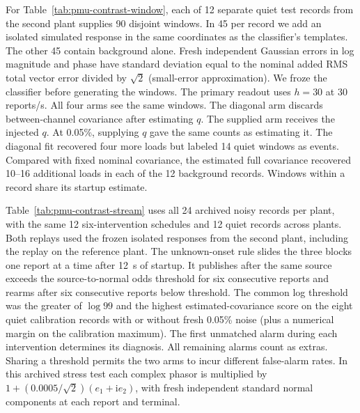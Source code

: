 For Table~\ref{tab:pmu-contrast-window}, each of 12 separate quiet
test records from the second plant supplies 90 disjoint windows.
In 45 per record we add an isolated simulated response in the same
coordinates as the classifier's templates. The other 45 contain
background alone. Fresh independent Gaussian errors in log magnitude
and phase have standard deviation equal to the nominal added RMS
total vector error divided by $\sqrt{2}$ (small-error approximation).
We froze the classifier before generating the windows. The primary
readout uses $h=30$ at 30 reports/s. All four arms see the same
windows. The diagonal arm discards between-channel covariance after
estimating $q$. The supplied arm receives the injected $q$.
At 0.05\%, supplying $q$ gave the same counts as estimating it.
The diagonal fit recovered four more loads but labeled 14 quiet
windows as events. Compared with fixed nominal covariance, the
estimated full covariance recovered 10--16 additional loads in each
of the 12 background records. Windows within a record share its
startup estimate.

\begin{table}[t]\centering\small
\caption{Continuous replay at 0.05\% added RMS total vector error.
Det., Fam.\ and Exact count detection, correct family and correct
family and asset before restoration among 72 interventions per plant.
Extra counts unmatched event-record alarms. Quiet$^+$ counts alarms
in \ContrastQuietHours{} normal hours per row.}
\label{tab:pmu-contrast-stream}

\end{table}

Table~\ref{tab:pmu-contrast-stream} uses all 24 archived noisy records
per plant, with the same 12 six-intervention schedules and 12 quiet
records across plants. Both replays used the frozen isolated responses
from the second plant, including the replay on the reference plant.
The unknown-onset rule slides the three blocks
one report at a time after 12~s of startup. It publishes after the
same source exceeds the source-to-normal odds threshold for six
consecutive reports and rearms after six consecutive reports below
threshold. The common log threshold was the greater of $\log 99$ and
the highest estimated-covariance score on the eight quiet calibration
records with or without fresh 0.05\% noise (plus a numerical margin
on the calibration maximum). The first unmatched alarm during each
intervention determines its diagnosis. All remaining alarms count as
extras. Sharing a threshold permits the two arms to incur different
false-alarm rates. In this archived stress test each complex phasor is
multiplied by $1+(0.0005/\sqrt{2})(e_1+\mathrm{i}e_2)$, with fresh
independent standard normal components at each report and terminal.

